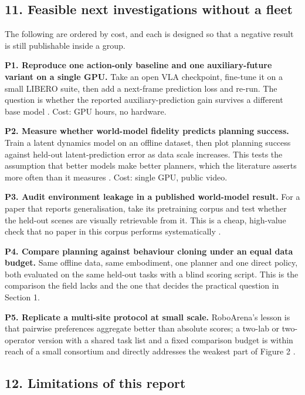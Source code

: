 \documentclass[
  10pt,
  english,
]{article}
\begin{document}
\hypertarget{feasible-next-investigations-without-a-fleet}{%
\subsection{11. Feasible next investigations without a
fleet}\label{feasible-next-investigations-without-a-fleet}}

The following are ordered by cost, and each is designed so that a
negative result is still publishable inside a group.

\textbf{P1. Reproduce one action-only baseline and one auxiliary-future
variant on a single GPU.} Take an open VLA checkpoint, fine-tune it on a
small LIBERO suite, then add a next-frame prediction loss and re-run.
The question is whether the reported auxiliary-prediction gain survives
a different base model \citep{worldvla, libero}. Cost: GPU hours, no
hardware.

\textbf{P2. Measure whether world-model fidelity predicts planning
success.} Train a latent dynamics model on an offline dataset, then plot
planning success against held-out latent-prediction error as data scale
increases. This tests the assumption that better models make better
planners, which the literature asserts more often than it measures
\citep{dino_wm, vjepa2}. Cost: single GPU, public video.

\textbf{P3. Audit environment leakage in a published world-model
result.} For a paper that reports generalisation, take its pretraining
corpus and test whether the held-out scenes are visually retrievable
from it. This is a cheap, high-value check that no paper in this corpus
performs systematically \citep{world_gymnast, dreamgen}.

\textbf{P4. Compare planning against behaviour cloning under an equal
data budget.} Same offline data, same embodiment, one planner and one
direct policy, both evaluated on the same held-out tasks with a blind
scoring script. This is the comparison the field lacks and the one that
decides the practical question in Section 1.

\textbf{P5. Replicate a multi-site protocol at small scale.} RoboArena's
lesson is that pairwise preferences aggregate better than absolute
scores; a two-lab or two-operator version with a shared task list and a
fixed comparison budget is within reach of a small consortium and
directly addresses the weakest part of Figure 2 \citep{roboarena, lbm}.

\hypertarget{limitations-of-this-report}{%
\subsection{12. Limitations of this
report}\label{limitations-of-this-report}}
\end{document}
